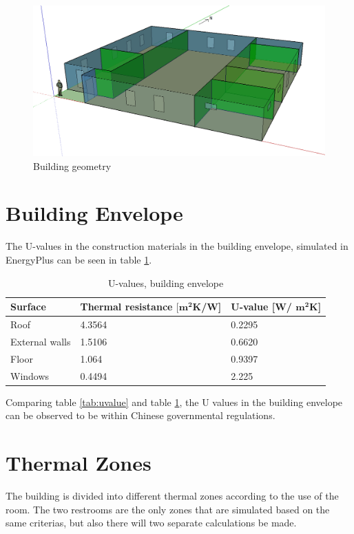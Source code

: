 \begin{figure}[h!]
    \centering
    \includegraphics[scale=0.4]{vedlegg/DMozN.png}
    \caption{Building geometry}
    \label{fig:zones}
\end{figure}

\section{Building Envelope}
The U-values in the construction materials in the building envelope, simulated in EnergyPlus can be seen in table \ref{tab:Uvalue}.

\begin{table}[h!]
    \centering
        \caption{U-values, building envelope}
    \begin{tabular}{p{2cm}|p{1.8cm}|p{2cm}}
         \textbf{Surface} & \textbf{Thermal resistance} $\mathbf{[m^2}$\textbf{K/W]} & \textbf{U-value [W/} $\mathbf{m^2}$\textbf{K]} \\
         \hline
        Roof & 4.3564 & 0.2295  \\
        \hline
        External walls & 1.5106 & 0.6620 \\
         \hline
        Floor & 1.064 & 0.9397 \\
         \hline
         Windows & 0.4494 & 2.225 \\
    \end{tabular}
    \label{tab:Uvalue}
\end{table}

Comparing table \ref{tab:uvalue} and table \ref{tab:Uvalue}, the U values in the building envelope can be observed to be within Chinese governmental regulations.

\section{Thermal Zones}
The building is divided into different thermal zones according to the use of the room. The two restrooms are the only zones that are simulated based on the same criterias, but also there will two separate calculations be made.

